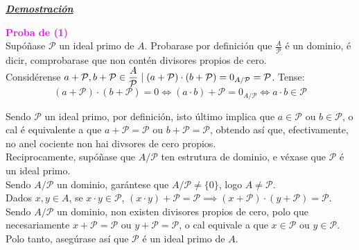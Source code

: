 \documentclass[twoside]{report}
\newcommand{\magbf}[1]{\textcolor{magenta}{\textbf{#1}}} %
\theoremstyle{mystyle}
\begin{document}
\vspace{2mm}

\noindent \textbf{\textit{\underline{Demostración}}}

\vspace{2mm}

\noindent \magbf{Proba de (1)}\\

\noindent {} Supóñase $\mathcal{P}$ un ideal primo de $A$. Probarase por definición que $\displaystyle \frac{A}{\mathcal{P}}$ é un dominio, é dicir, comprobarase que non contén divisores propios de cero.\\

\noindent Considérense $a + \mathcal{P}, b + \mathcal{P} \in \displaystyle \frac{A}{\mathcal{P}} \hspace{1mm} | \hspace{1mm} (a + \mathcal{P}) \cdot (b + \mathcal{P}) = 0_{A/\mathcal{P}} = \mathcal{P}$. Tense:
$$(a + \mathcal{P}) \cdot (b + \mathcal{P}) = 0 \Longleftrightarrow (a \cdot b) + \mathcal{P} = 0_{A/\mathcal{P}} \Longleftrightarrow a \cdot b \in \mathcal{P}$$

\noindent Sendo $\mathcal{P}$ un ideal primo, por definición, isto último implica que $a \in \mathcal{P}$ ou $b \in \mathcal{P}$, o cal é equivalente a que $a + \mathcal{P} = \mathcal{P}$ ou $b + \mathcal{P} = \mathcal{P}$, obtendo así que, efectivamente, no anel cociente non hai divsores de cero propios.\\

\noindent {} Reciprocamente, supóñase que $A/\mathcal{P}$ ten estrutura de dominio, e véxase que $\mathcal{P}$ é un ideal primo.\\

\noindent Sendo $A/\mathcal{P}$ un dominio, garántese que $A/\mathcal{P} \neq \{0\}$, logo $A \neq \mathcal{P}$.\\

\noindent Dados $x, y \in A$, se $x \cdot y \in \mathcal{P}$, $(x \cdot y) + \mathcal{P} = \mathcal{P} \implies (x + \mathcal{P}) \cdot (y + \mathcal{P}) = \mathcal{P}$. Sendo $A/\mathcal{P}$ un dominio, non existen divisores propios de cero, polo que necesariamente $x + \mathcal{P} = \mathcal{P}$ ou $y + \mathcal{P} = \mathcal{P}$, o cal equivale a que $x \in \mathcal{P}$ ou $y \in \mathcal{P}$. Polo tanto, asegúrase así que $\mathcal{P}$ é un ideal primo de $A$.\\
\end{document}
